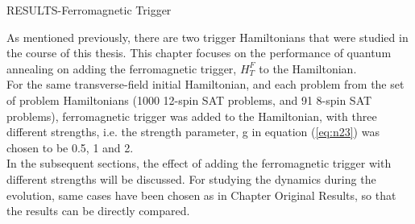 \documentclass[12]{article}
\begin{document}
\begin{center}
\begin{Huge}
RESULTS-Ferromagnetic Trigger
\end{Huge}
\end{center}
As mentioned previously, there are two trigger Hamiltonians that were studied in the course of this thesis. This chapter focuses on the performance of quantum annealing on adding the ferromagnetic trigger, $H_T^F$ to the Hamiltonian. \\
For the same transverse-field initial Hamiltonian, and each problem from the set of problem Hamiltonians (1000 12-spin SAT problems, and 91 8-spin SAT problems), ferromagnetic trigger was added to the Hamiltonian, with three different strengths, i.e. the strength parameter, g in equation (\ref{eq:n23}) was chosen to be 0.5, 1 and 2.\\
In the subsequent sections, the effect of adding the ferromagnetic trigger with different strengths will be discussed. For studying the dynamics during the evolution, same cases have been chosen as in Chapter Original Results, so that the results can be directly compared. 
\end{document}
